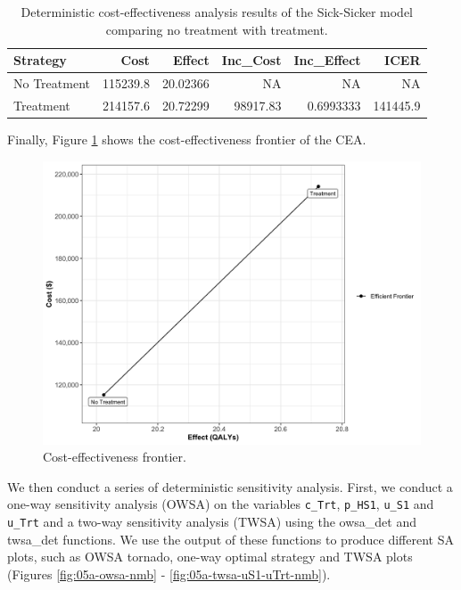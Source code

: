\documentclass[]{book}
\begin{document}
\begin{table}[t]

\caption{\label{tab:df-cea-det}Deterministic cost-effectiveness analysis results of the Sick-Sicker model comparing no treatment with treatment.}
\centering
\begin{tabular}{l|r|r|r|r|r}
\hline
Strategy & Cost & Effect & Inc\_Cost & Inc\_Effect & ICER\\
\hline
No Treatment & 115239.8 & 20.02366 & NA & NA & NA\\
\hline
Treatment & 214157.6 & 20.72299 & 98917.83 & 0.6993333 & 141445.9\\
\hline
\end{tabular}
\end{table}

Finally, Figure \ref{fig:05a-CEA-frontier} shows the cost-effectiveness
frontier of the CEA.

\begin{figure}

{\centering \includegraphics[width=33.33in]{../figs/05a_cea_frontier} 

}

\caption{Cost-effectiveness frontier.}\label{fig:05a-CEA-frontier}
\end{figure}

We then conduct a series of deterministic sensitivity analysis. First,
we conduct a one-way sensitivity analysis (OWSA) on the variables
\texttt{c\_Trt}, \texttt{p\_HS1}, \texttt{u\_S1} and \texttt{u\_Trt} and
a two-way sensitivity analysis (TWSA) using the owsa\_det and twsa\_det
functions. We use the output of these functions to produce different SA
plots, such as OWSA tornado, one-way optimal strategy and TWSA plots
(Figures \ref{fig:05a-owsa-nmb} - \ref{fig:05a-twsa-uS1-uTrt-nmb}).
\end{document}
